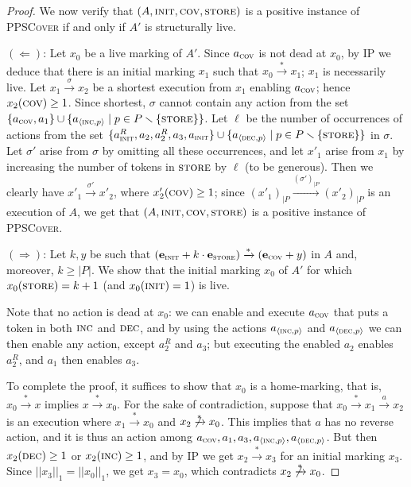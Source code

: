 \documentclass[11pt,a4paper]{amsart}
\newcommand{\step}[1]{\mathrel{\xrightarrow{#1}}}
\newcommand{\reach}{\step{*}}
\newcommand{\PPSCover}{\textsc{PPSCover}\xspace}
\newcommand{\lara}[1]{{\langle #1\rangle}}
\newcommand{\normone}[1]{||#1||_1}
\newcommand{\pinit}{\textsc{init}}
\newcommand{\pcov}{\textsc{cov}}
\newcommand{\pstore}{\textsc{store}}
\newcommand{\pinc}{\textsc{inc}}
\newcommand{\pdec}{\textsc{dec}}
\newcommand{\restr}[1]{_{|{#1}}}
\let\origtextsc\textsc
\renewcommand{\textsc}[1]{\textnormal{\origtextsc{#1}}}
\theoremstyle{plain}
\theoremstyle{definition}
\theoremstyle{defC}
\theoremstyle{thmC}
\begin{document}
\begin{proof}
We now verify that  
 $(A,\pinit,\pcov,\pstore)$ is a positive instance of \PPSCover if and
 only if $A'$ is structurally live.

$(\Leftarrow)$:	
		Let $x_0$ be a live marking of
		$A'$. Since $a_\pcov$ is not dead at $x_0$, by \textsc{IP}
we deduce that	there is an initial marking $x_1$ such that $x_0\reach
		x_1$; $x_1$ is necessarily live. 
		Let $x_1\step{\sigma}x_2$ be a shortest execution from
		$x_1$ enabling $a_\pcov$; hence $x_2(\pcov)\geq 1$.
Since shortest, $\sigma$ cannot contain any action from the set 
		$\{a_\pcov,a_1\}\cup \{a_\lara{\pinc,p}\mid p\in
		P\smallsetminus\{\pstore\}\}$.
Let $\ell$ be the number of occurrences of actions
		from the set
		$\{a^R_\pinit,a_2,a^R_2,a_3,a_\pinit\}\cup 
		\{a_\lara{\pdec,p}\mid p\in
		P\smallsetminus\{\pstore\}\}$ in $\sigma$.
Let $\sigma'$ arise from $\sigma$ by omitting all these occurrences,
		and let $x'_1$ arise from $x_1$ by
		increasing the number of tokens in $\pstore$ by
		$\ell$ (to be generous). Then we clearly have
		$x'_1\step{\sigma'}x'_2$, where $x'_2(\pcov)\geq 1$;
		since
		$(x'_1)\restr{P}\step{(\sigma')\restr{P}}(x'_2)\restr{P}$
		is an execution of $A$, we get that 
 $(A,\pinit,\pcov,\pstore)$ is a
		positive instance of \PPSCover.

		$(\Rightarrow)$:
		Let $k,y$ be such that 
		$(\mathbf{e}_\pinit+k\cdot \mathbf{e}_\pstore)\reach
	(\mathbf{e}_\pcov+y)$ in $A$ and, moreover, $k\geq |P|$.  We  show that 
		the initial marking $x_0$ of $A'$ for which	
		$x_0(\pstore)=k+1$ (and	$x_0(\pinit)=1$) is
		live.

Note that no action is dead at $x_0$: we can enable and
		execute
		$a_\pcov$ that puts a token in both $\pinc$ and $\pdec$, and by
		using the actions $a_\lara{\pinc,p}$ and
		$a_\lara{\pdec,p}$ we can then enable any action, except
		$a^R_2$ and $a_3$; but executing the enabled $a_2$
		enables $a^R_2$, and $a_1$ then enables $a_3$.

To complete the proof,
		it suffices to show that $x_0$ is a
		home-marking, that is, $x_0\reach x$ implies
$x\reach x_0$. For the sake of contradiction,
suppose that 
	$x_0\reach x_1\step{a}x_2$ is an execution where $x_1\reach x_0$
		and $x_2\not\reach x_0$. This implies that $a$ has no reverse
		action, and it is thus an action among
		$a_\pcov,a_1,a_3,a_\lara{\pinc,p},a_\lara{\pdec,p}$. But
		then $x_2(\pdec)\geq 1$ or  $x_2(\pinc)\geq 1$,
and by \textsc{IP} we get $x_2\reach
		x_3$ for an initial marking $x_3$. Since
		$\normone{x_3}=\normone{x_0}$, we get 
 $x_3=x_0$, which contradicts $x_2\not\reach x_0$.
\end{proof}
\end{document}
